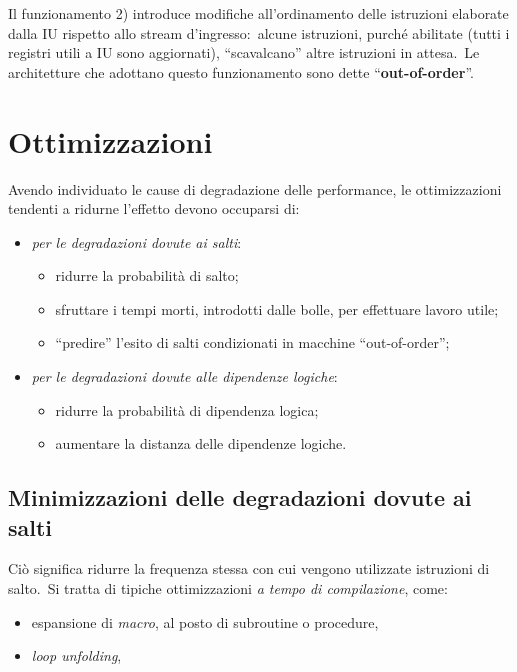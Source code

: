 Il funzionamento 2) introduce modifiche all'ordinamento delle istruzioni elaborate dalla IU rispetto allo stream d'ingresso:\ alcune istruzioni, purché abilitate (tutti i registri utili a IU sono aggiornati), ``scavalcano'' altre istruzioni in attesa.\
Le architetture che adottano questo funzionamento sono dette ``\textbf{out-of-order}''.

\section{Ottimizzazioni}

Avendo individuato le cause di degradazione delle performance, le ottimizzazioni tendenti a ridurne l'effetto devono occuparsi di:
\begin{itemize}
    \item \textit{per le degradazioni dovute ai salti}:
          \begin{itemize}
              \item ridurre la probabilità di salto;
              \item sfruttare i tempi morti, introdotti dalle bolle, per effettuare lavoro utile;
              \item ``predire'' l'esito di salti condizionati in macchine ``out-of-order'';
          \end{itemize}
    \item \textit{per le degradazioni dovute alle dipendenze logiche}:
          \begin{itemize}
              \item ridurre la probabilità di dipendenza logica;
              \item aumentare la distanza delle dipendenze logiche.
          \end{itemize}
\end{itemize}

\subsection{Minimizzazioni delle degradazioni dovute ai salti}

Ciò significa ridurre la frequenza stessa con cui vengono utilizzate istruzioni di salto.\
Si tratta di tipiche ottimizzazioni \textit{a tempo di compilazione}, come:

\begin{itemize}
    \item espansione di \textit{macro}, al posto di subroutine o procedure,
    \item \textit{loop unfolding},
\end{itemize}

